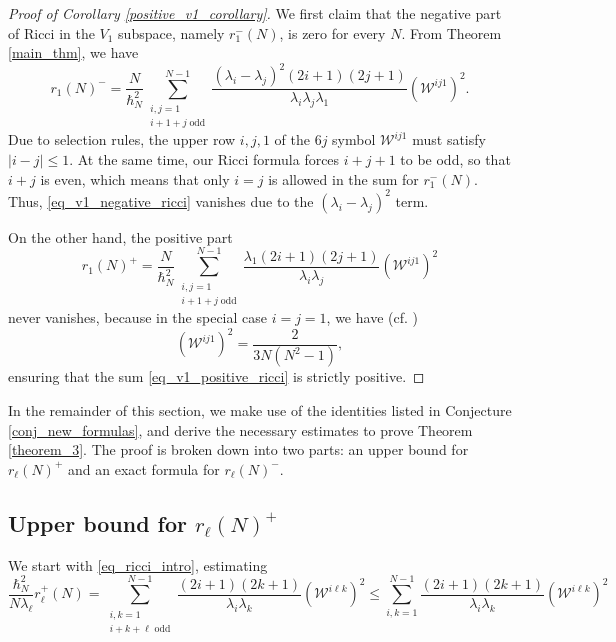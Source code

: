 \documentclass[11pt]{amsart}
\numberwithin{equation}{section}
\theoremstyle{definition}
\begin{document}
\begin{proof}[Proof of Corollary \ref{positive_v1_corollary}]
We first claim that the negative part of Ricci in the $V_1$ subspace, namely $r_1^-(N)$, is zero for every $N$. From Theorem \ref{main_thm}, we have
\begin{equation}\label{eq_v1_negative_ricci}
r_{1}(N)^- = \frac{N}{\hbar_N^2}\sum\limits_{\substack{i, j = 1 \\ i+1+j\;\mathrm{odd}}}^{N-1}
\frac{
(\lambda_i-\lambda_j)^2
(2i+1)(2j+1)
}
{\lambda_i\lambda_j\lambda_{1}}\left(\mathcal{W}^{ij1}\right)^2.
\end{equation}
Due to selection rules, the upper row $i, j, 1$ of the $6j$ symbol $\mathcal{W}^{ij1}$ must satisfy $|i-j| \leq 1$. At the same time, our Ricci formula forces $i+j+1$ to be odd, so that $i+j$ is even, which means that only $i = j$ is allowed in the sum for $r_1^-(N)$. Thus, \eqref{eq_v1_negative_ricci} vanishes due to the $(\lambda_i-\lambda_j)^2$ term.


On the other hand, the positive part
\begin{equation}\label{eq_v1_positive_ricci}
r_{1}(N)^+ = \frac{N}{\hbar_N^2}\sum\limits_{\substack{i, j = 1 \\ i+1+j\;\mathrm{odd}}}^{N-1}
\frac{
\lambda_{1}
(2i+1)(2j+1)
}
{\lambda_i\lambda_{j}}\left(\mathcal{W}^{ij1}\right)^2
\end{equation}
never vanishes, because in the special case $i = j = 1$, we have (cf. \cite{Varshalovich1988quantum})
\begin{equation}
\left(\mathcal{W}^{ij1}\right)^2 = \frac{2}{3N(N^2-1)},
\end{equation}
ensuring that the sum \eqref{eq_v1_positive_ricci} is strictly positive.
\end{proof}

\noindent In the remainder of this section, we make use of the identities listed in Conjecture \ref{conj_new_formulas}, and derive the necessary estimates to prove Theorem \ref{theorem_3}. The proof is broken down into two parts: an upper bound for $r_{\ell}(N)^+$ and an exact formula for $r_{\ell}(N)^-$. 

\subsection{Upper bound for $r_{\ell}(N)^+$}

We start with \eqref{eq_ricci_intro}, estimating
\begin{equation}
\frac{\hbar_N^2}{N\lambda_\ell} r_\ell^+(N)
=
\sum\limits_{\substack{i, k = 1 \\ i+k+\ell\;\mathrm{odd}}}^{N-1}
\frac{
(2i+1)(2k+1)
}
{\lambda_i\lambda_{k}}(\mathcal{W}^{i\ell k})^2
\le 
\sum_{i, k = 1}^{N-1}
\frac{
(2i+1)(2k+1)
}
{\lambda_i\lambda_{k}}(\mathcal{W}^{i\ell k})^2 
\end{equation}
\end{document}

